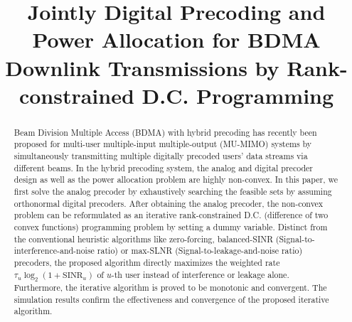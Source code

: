 \documentclass[10pt,journal,twocolumn,twoside]{IEEEtran}
\begin{document}
\title{Jointly Digital Precoding and Power Allocation for BDMA Downlink Transmissions by Rank-constrained D.C. Programming}
\author{}
\maketitle\thispagestyle{plain}\pagestyle{plain}

\begin{abstract}
Beam Division Multiple Access (BDMA) with hybrid precoding has recently been proposed for multi-user multiple-input multiple-output (MU-MIMO) systems by simultaneously transmitting multiple digitally precoded users' data streams via different beams. In the hybrid precoding system, the analog and digital precoder design as well as the power allocation problem are highly non-convex. In this paper, we first solve the analog precoder by exhaustively searching the feasible sets by assuming orthonormal digital precoders. After obtaining the analog precoder, the non-convex problem can be reformulated as an iterative rank-constrained D.C. (difference of two convex functions) programming problem by setting a dummy variable. Distinct from the conventional heuristic algorithms like zero-forcing, balanced-SINR (Signal-to-interference-and-noise ratio) or max-SLNR (Signal-to-leakage-and-noise ratio) precoders, the proposed algorithm directly maximizes the weighted rate $\tau_u\log_2(1+\text{SINR}_u)$ of $u$-th user instead of interference or leakage alone. Furthermore, the iterative algorithm is proved to be monotonic and convergent. The simulation results confirm the effectiveness and convergence of the proposed iterative algorithm.
\end{abstract}

\end{document}
